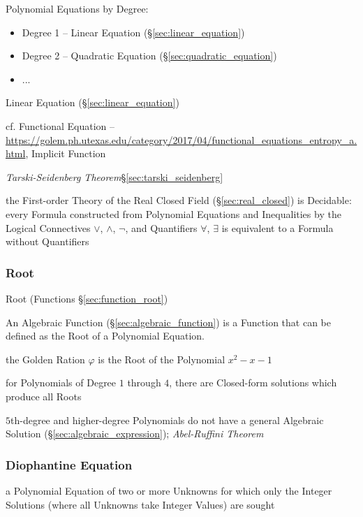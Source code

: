 Polynomial Equations by Degree:
\begin{itemize}
  \item Degree 1 -- Linear Equation (\S\ref{sec:linear_equation})
  \item Degree 2 -- Quadratic Equation (\S\ref{sec:quadratic_equation})
  \item ...
\end{itemize}

Linear Equation (\S\ref{sec:linear_equation})

cf. Functional Equation --
\url{https://golem.ph.utexas.edu/category/2017/04/functional_equations_entropy_a.html},
Implicit Function %


\emph{Tarski-Seidenberg Theorem}\S\ref{sec:tarski_seidenberg}

the First-order Theory of the Real Closed Field (\S\ref{sec:real_closed}) is
Decidable: every Formula constructed from Polynomial Equations and Inequalities
by the Logical Connectives $\vee$, $\wedge$, $\neg$, and Quantifiers $\forall$,
$\exists$ is equivalent to a Formula without Quantifiers



\subsubsection{Root}\label{sec:equation_root}

\fist Root (Functions \S\ref{sec:function_root})

An Algebraic Function (\S\ref{sec:algebraic_function}) is a Function that can
be defined as the Root of a Polynomial Equation.

the Golden Ration $\varphi$ is the Root of the Polynomial $x^2 - x - 1$

for Polynomials of Degree $1$ through $4$, there are Closed-form solutions
which produce all Roots

$5$th-degree and higher-degree Polynomials do not have a general Algebraic
Solution (\S\ref{sec:algebraic_expression}); \emph{Abel-Ruffini Theorem}



\subsubsection{Diophantine Equation}\label{sec:diophantine_equation}

a Polynomial Equation of two or more Unknowns for which only the Integer
Solutions (where all Unknowns take Integer Values) are sought

